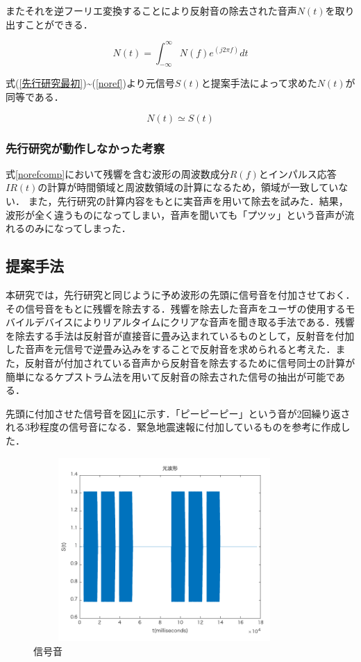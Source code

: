 \documentclass[a4j,11pt]{jsarticle}
\begin{document}
またそれを逆フーリエ変換することにより反射音の除去された音声$N(t)$を取り出すことができる．

{\Large
\begin{equation}
	\label{noref}
  N(t) =  \int^{\infty}_{-\infty}N(f)e^{(j2\pi f)}dt 
\end{equation}
}

式(\ref{先行研究最初})\textasciitilde(\ref{noref})より元信号$S(t)$と提案手法によって求めた$N(t)$が同等である．

{\Large
\begin{equation}
  N(t)\simeq S(t)
\end{equation}
}



\subsubsection{先行研究が動作しなかった考察}
式\ref{norefcomp}において残響を含む波形の周波数成分$R(f)$とインパルス応答$IR(t)$の計算が時間領域と周波数領域の計算になるため，領域が一致していない．
また，先行研究の計算内容をもとに実音声を用いて除去を試みた．結果，波形が全く違うものになってしまい，音声を聞いても「プツッ」という音声が流れるのみになってしまった．


\newpage
\subsection{提案手法}
本研究では，先行研究と同じように予め波形の先頭に信号音を付加させておく．その信号音をもとに残響を除去する．残響を除去した音声をユーザの使用するモバイルデバイスによりリアルタイムにクリアな音声を聞き取る手法である．残響を除去する手法は反射音が直接音に畳み込まれているものとして，反射音を付加した音声を元信号で逆畳み込みをすることで反射音を求められると考えた．また，反射音が付加されている音声から反射音を除去するために信号同士の計算が簡単になるケプストラム法を用いて反射音の除去された信号の抽出が可能である．

先頭に付加させた信号音を図\ref{fig:信号音}に示す．「ピーピーピー」という音が2回繰り返される3秒程度の信号音になる．緊急地震速報に付加しているものを参考に作成した．
\begin{figure}[h]
\begin{center}
 \includegraphics[clip,width=100mm,height=70mm]{sinngouon.pdf}
\end{center}
 \caption{信号音}
 \label{fig:信号音}
\end{figure}
\end{document}
